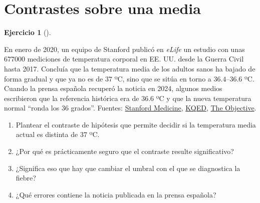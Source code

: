 \documentclass[
  spanish,
  a4paper,
]{scrreport}
\theoremstyle{definition}
\newtheorem{exercise}{Ejercicio}[chapter]
\theoremstyle{remark}
\begin{document}
\section{Contrastes sobre una media}\label{contrastes-sobre-una-media}

\begin{exercise}[]\protect\hypertarget{exr-interpretacion-temperatura-corporal}{}\label{exr-interpretacion-temperatura-corporal}

En enero de 2020, un equipo de Stanford publicó en \emph{eLife} un
estudio con unas \(677000\) mediciones de temperatura corporal en EE.
UU. desde la Guerra Civil hasta 2017. Concluía que la temperatura media
de los adultos sanos ha bajado de forma gradual y que ya no es de \(37\)
ºC, sino que se sitúa en torno a \(36.4\)--\(36.6\) ºC. Cuando la prensa
española recuperó la noticia en 2024, algunos medios escribieron que la
referencia histórica era de \(36.6\) ºC y que la nueva temperatura
normal ``ronda los \(36\) grados''. Fuentes:
\href{https://med.stanford.edu/news/all-news/2020/01/human-body-temperature-has-decreased-in-united-states.html}{Stanford
Medicine},
\href{https://kqed.org/science/1954750/youre-cooler-than-you-think-98-6-temperature-no-longer-the-norm}{KQED},
\href{https://theobjective.com/sociedad/ciencia/2024-11-14/ciencia-anuncia-temperatura-corporal-normal-no-36-grados/}{The
Objective}.

\begin{enumerate}
\def\labelenumi{\alph{enumi}.}
\item
  Plantear el contraste de hipótesis que permite decidir si la
  temperatura media actual es distinta de \(37\) ºC.
\item
  ¿Por qué es prácticamente seguro que el contraste resulte
  significativo?
\item
  ¿Significa eso que hay que cambiar el umbral con el que se diagnostica
  la fiebre?
\item
  ¿Qué errores contiene la noticia publicada en la prensa española?
\end{enumerate}

\end{exercise}
\end{document}
